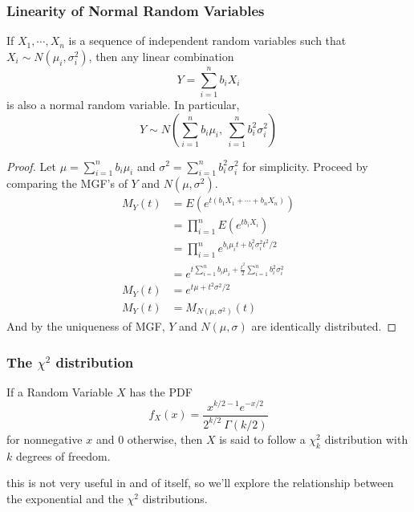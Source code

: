 \documentclass[10pt, aspectratio=169]{beamer}
\theoremstyle{definition}
\begin{document}
\begin{frame}[allowframebreaks]
\frametitle{Linearity of Normal Random Variables}
\begin{theorem}
	If $X_1, \cdots, X_n$ is a sequence of independent random variables such that $X_i \sim N(\mu_i, \sigma_i^2)$, then any linear combination $$Y = \sum_{i=1}^n b_i X_i$$ is also a normal random variable. In particular, $$Y \sim N\left( \sum_{i=1}^n b_i\mu_i,\ \sum_{i=1}^n b_i^2\sigma_i^2 \right)$$
\end{theorem}
\pause
\begin{proof}
	Let $\mu = \sum_{i=1}^n b_i\mu_i$ and $\sigma^2 = \sum_{i=1}^n b_i^2\sigma_i^2$ for simplicity. Proceed by comparing the MGF's of $Y$ and $N(\mu, \sigma^2)$. 
	\begin{align*}
	M_Y(t) &= E(e^{t(b_1X_1 + \cdots + b_nX_n)}) \\
	&= \prod_{i=1}^n E(e^{tb_iX_i}) \\
	&= \prod_{i=1}^n e^{b_i\mu_it + b_i^2\sigma_i^2t^2/2} \\
	&= e^{t\sum_{i=1}^n b_i\mu_i + \frac{t^2}{2} \sum_{i=1}^n b_i^2\sigma_i^2} \\
	M_Y(t) &= e^{t\mu + t^2\sigma^2/2} \\
	M_Y(t) &= M_{N(\mu, \sigma^2)}(t)
	\end{align*}
	And by the uniqueness of MGF, $Y$ and $N(\mu, \sigma)$ are identically distributed.
\end{proof}
\end{frame}

\begin{frame}
\frametitle{The $\chi^2$ distribution}
\begin{definition}
	If a Random Variable $X$ has the PDF $$f_X(x) = \frac{x^{k/2-1}e^{-x/2}}{2^{k/2}\ \Gamma(k/2)}$$ for nonnegative $x$ and $0$ otherwise, then $X$ is said to follow a $\chi^2_k$ distribution with $k$ degrees of freedom.
\end{definition}
\pause

this is not very useful in and of itself, so we'll explore the relationship between the exponential and the $\chi^2$ distributions.
\end{frame}
\end{document}
